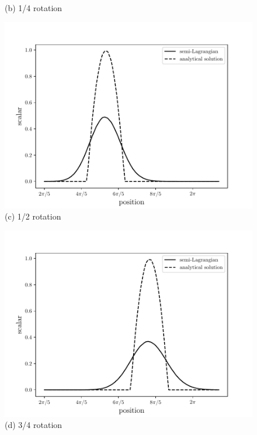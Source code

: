 \begin{center}
\begin{figure}[H]
\begin{minipage}{.5\linewidth}
      (b) 1/4 rotation
     \end{minipage}
     \begin{minipage}{.5\linewidth}
      \centering
      \includegraphics[scale=0.53]{./02_chaps/cap_validation/figure/SLlinear2.pdf}\\
      (c) 1/2 rotation
     \end{minipage}%
     \begin{minipage}{.5\linewidth}
      \centering
      \includegraphics[scale=0.53]{./02_chaps/cap_validation/figure/SLlinear3.pdf}\\
      (d) 3/4 rotation
     \end{minipage}
     \label{SL linear}
\end{figure}
\end{center}


